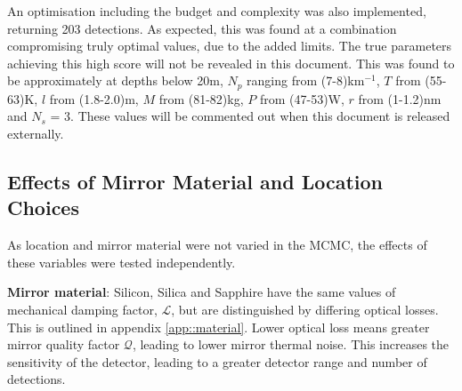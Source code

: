 \documentclass{article}
\begin{document}
An optimisation including the budget and complexity was also implemented, returning 203 detections. As expected, this was found at a combination compromising truly optimal values, due to the added limits. The true parameters achieving this high score will not be revealed in this document. 
This was found to be approximately at depths below 20m, $N_p$ ranging from (7-8)km$^{-1}$, $T$ from (55-63)K, $l$ from (1.8-2.0)m,  $M$ from (81-82)kg, $P$ from (47-53)W, $r$ from (1-1.2)nm and $N_s$ = 3. These values will be commented out when this document is released externally. 

\subsection{Effects of Mirror Material and Location Choices}
As location and mirror material were not varied in the MCMC, the effects of these variables were tested independently. 

\textbf{Mirror material}: Silicon, Silica and Sapphire have the same values of mechanical damping factor, $\mathcal{L}$, but are distinguished by differing optical losses. This is outlined in appendix \ref{app::material}. Lower optical loss means greater mirror quality factor $\mathcal{Q}$, leading to lower mirror thermal noise. This increases the sensitivity of the detector, leading to a greater detector range and number of detections. 
\end{document}
